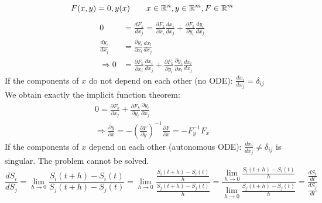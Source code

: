 \documentclass{report}
\begin{document}
\begin{equation*}
	F(x,y) = 0, y(x) \qquad x\in\mathbb{R}^n, y\in\mathbb{R}^m,F\in\mathbb{R}^m\\
\end{equation*}
\begin{align}
	0 &= \frac{dF_k}{dx_j} = \frac{\partial F_k}{\partial x_i}\frac{dx_i}{dx_j} + \frac{\partial F_k}{\partial y_i}\frac{dy_i}{dx_j} \\
	\frac{dy_i}{dx_j} &= \frac{\partial y_i}{\partial x_l}\frac{dx_l}{dx_j} \\
	\Rightarrow 0 &= \frac{\partial F_k}{\partial x_i}\frac{dx_i}{dx_j} + \frac{\partial F_k}{\partial y_i}\frac{\partial y_i}{\partial x_l}\frac{dx_l}{dx_j}
\end{align}
If the components of $x$ do not depend on each other (no ODE): $\frac{dx_i}{dx_j} = \delta_{ij}$ \\
We obtain exactly the implicit function theorem:
\begin{align}
	0 = \frac{\partial F_k}{\partial x_j} + \frac{\partial F_k}{\partial y_i}\frac{\partial y_i}{\partial x_j} \\
	\Rightarrow \frac{\partial y}{\partial x} = -\left(\frac{\partial F}{\partial y}\right)^{-1}\frac{\partial F}{\partial x} = -F_y^{-1}F_x
\end{align}
If the components of $x$ depend on each other (autonomous ODE): $\frac{dx_i}{dx_j} \neq \delta_{ij}$ is singular. The problem cannot be solved. \\


\begin{equation}
	\frac{dS_i}{dS_j} = \lim\limits_{h\rightarrow0}\frac{S_i(t+h) - S_i(t)}{S_j(t+h) - S_j(t)} = \lim\limits_{h\rightarrow0}\frac{\frac{S_i(t+h) - S_i(t)}{h}}{\frac{S_j(t+h) - S_j(t)}{h}} = \frac{\lim\limits_{h\rightarrow0}\frac{S_i(t+h) - S_i(t)}{h}}{\lim\limits_{h\rightarrow0}\frac{S_j(t+h) - S_j(t)}{h}} = \frac{\frac{dS_i}{dt}}{\frac{dS_j}{dt}}
\end{equation}




\end{document}
